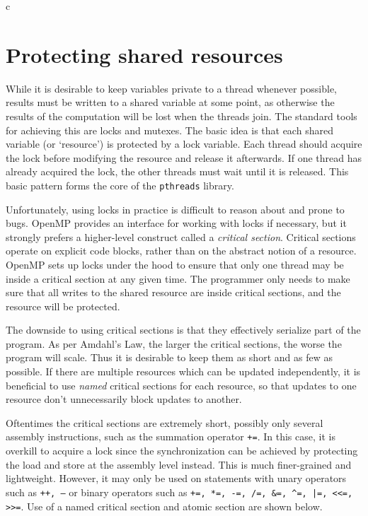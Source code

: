 \documentclass[conference, a4paper]{IEEEtran-modified}
\begin{document}
\begin{ccode}[]{c}
\section{Protecting shared resources}

  While it is desirable to keep variables private to a thread whenever possible, results must be written to a shared variable at some point, as otherwise the results of the computation will be lost when the threads join. The standard tools for achieving this are locks and mutexes. The basic idea is that each shared variable (or `resource') is protected by a lock variable. Each thread should acquire the lock before modifying the resource and release it afterwards. If one thread has already acquired the lock, the other threads must wait until it is released. This basic pattern forms the core of the \texttt{pthreads} library. 

  Unfortunately, using locks in practice is difficult to reason about and prone to bugs. OpenMP provides an interface for working with locks if necessary, but it strongly prefers a higher-level construct called a \emph{critical section}. Critical sections operate on explicit code blocks, rather than on the abstract notion of a resource. OpenMP sets up locks under the hood to ensure that only one thread may be inside a critical section at any given time. The programmer only needs to make sure that all writes to the shared resource are inside critical sections, and the resource will be protected.

  The downside to using critical sections is that they effectively serialize part of the program. As per Amdahl's Law, the larger the critical sections, the worse the program will scale. Thus it is desirable to keep them as short and as few as possible. If there are multiple resources which can be updated independently, it is beneficial to use \emph{named} critical sections for each resource, so that updates to one resource don't unnecessarily block updates to another.

  Oftentimes the critical sections are extremely short, possibly only several assembly instructions, such as the summation operator \texttt{+=}. In this case, it is overkill to acquire a lock since the synchronization can be achieved by protecting the load and store at the assembly level instead. This is much finer-grained and lightweight. However, it may only be used on statements with unary operators such as \texttt{++, --} or binary operators such as \texttt{+=, *=, -=, /=, &=, ^=, |=, <<=, >>=}. Use of a named critical section and atomic section are shown below.


\end{ccode}
\end{document}
